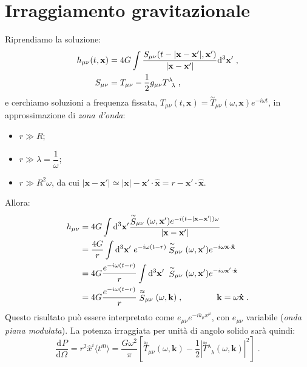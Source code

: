 \documentclass[12pt,a4paper]{report}
\theoremstyle{definition}
\newcommand{\dev}[3][]{\frac{\mathrm{d}^{#1} #2}{\mathrm{d} #3^{#1}}}
\newcommand{\diff}[1][]{\mathrm{d}#1}
\newcommand{\bra}{\langle}
\newcommand{\ket}{\rangle}
\begin{document}
\section{Irraggiamento gravitazionale}
Riprendiamo la soluzione:
\begin{align}
h_{\mu\nu}(t,\mathbf{x}) &= 4G\int \frac{S_{\mu\nu}(t-|\mathbf{x}-\mathbf{x}'|,\mathbf{x}')}{|\mathbf{x}-\mathbf{x}'|}
\diff^3{\mathbf{x}'}\;, \\
S_{\mu\nu} &= T_{\mu\nu}-\frac{1}{2}g_{\mu\nu}T^{\lambda}_{\;\;\lambda} \notag\;,
\end{align}
e cerchiamo soluzioni a frequenza fissata, $T_{\mu\nu}(t,\mathbf{x})=\stackrel{\sim}{T}_{\mu\nu}(\omega,\mathbf{x})e^{-i\omega t}$, in approssimazione di \emph{zona d'onda}:
\begin{itemize}
\item $r\gg R$;
\item $r\gg \lambda=\dfrac{1}{\omega}$;
\item $r\gg R^2\omega$, da cui $|\mathbf{x}-\mathbf{x}'|\simeq |\mathbf{x}|-\mathbf{x}'\cdot\mathbf{\hat{x}}=r-\mathbf{x}'\cdot\mathbf{\hat{x}}$.
\end{itemize}
Allora:
\begin{align}
h_{\mu\nu} &= 4G\int\diff^3{\mathbf{x}'}\frac{\stackrel{\sim}{S}_{\mu\nu}(\omega,\mathbf{x}')e^{-i(t-|\mathbf{x}-\mathbf{x}'|)\omega}}{|\mathbf{x}-\mathbf{x}'|} \notag \\
&= \frac{4G}{r}\int \diff^3{\mathbf{x}'}\; e^{-i\omega(t-r)}\stackrel{\sim}{S}_{\mu\nu}(\omega,\mathbf{x}')e^{-i\omega\mathbf{x}\cdot\mathbf{\hat{x}}} \notag \\
&=4G\frac{e^{-i\omega(t-r)}}{r}\int\diff^3{\mathbf{x}'}\;\stackrel{\sim}{S}_{\mu\nu}(\omega,\mathbf{x}')e^{-i\omega\mathbf{x}'\cdot\mathbf{\hat{x}}} \notag \\
&= 4G\frac{e^{-i\omega(t-r)}}{r}\stackrel{\approx}{S}_{\mu\nu}(\omega,\mathbf{k})\;,\qquad\qquad \mathbf{k}=\omega\mathbf{\hat{x}}\;.
\end{align}
Questo risultato può essere interpretato come $e_{\mu\nu}e^{-ik_{\mu}x^{\mu}}$, con $e_{\mu\nu}$ variabile (\emph{onda piana modulata}). La potenza irraggiata per unità di angolo solido sarà quindi:
\begin{equation}
\dev{P}{\Omega}=r^2\hat{x}^i\bra t^{i0}\ket=\frac{G\omega^2}{\pi}\left[\stackrel{\approx}{T}_{\mu\nu}(\omega,\mathbf{k})-\frac{1}{2}\left|\stackrel{\approx}{T}{}^{\lambda}_{\;\;\lambda}(\omega,\mathbf{k})\right|^2\right]\;. \label{ch5_power}
\end{equation}
\end{document}
